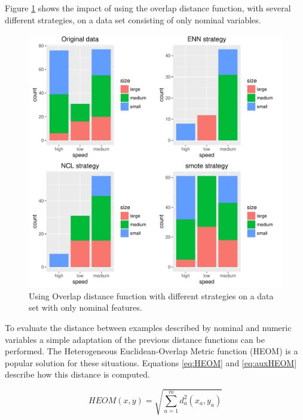 \documentclass[10pt,a4paper]{article}\usepackage[]{graphicx}\usepackage[]{color}
\makeatletter
\def\maxwidth{ %
  \ifdim\Gin@nat@width>\linewidth
    \linewidth
  \else
    \Gin@nat@width
  \fi
}
\newenvironment{knitrout}{}{} %
\makeatother
\begin{document}
Figure \ref{fig:dist_overlap} shows the impact of using the overlap distance function, with several different strategies, on a data set consisting of only nominal variables.
\begin{knitrout}\footnotesize
{}\color{fgcolor}\begin{figure}

{\centering \includegraphics[width=\maxwidth]{figures/UBL-dist_overlap-1} 

}

\caption[Using Overlap distance function with different strategies on a data set with only nominal features]{Using Overlap distance function with different strategies on a data set with only nominal features.}\label{fig:dist_overlap}
\end{figure}


\end{knitrout}

To evaluate the distance between examples described by nominal and numeric variables a simple adaptation of the previous distance functions can be performed. The Heterogeneous Euclidean-Overlap Metric function (HEOM) is a popular solution for these situations. Equations \ref{eq:HEOM} and \ref{eq:auxHEOM} describe how this distance is computed.


\begin{equation}\label{eq:HEOM}
HEOM(x,y)= \sqrt{\sum_{a=1}^{m}d_a^2(x_a,y_a) }
\end{equation}
\end{document}
